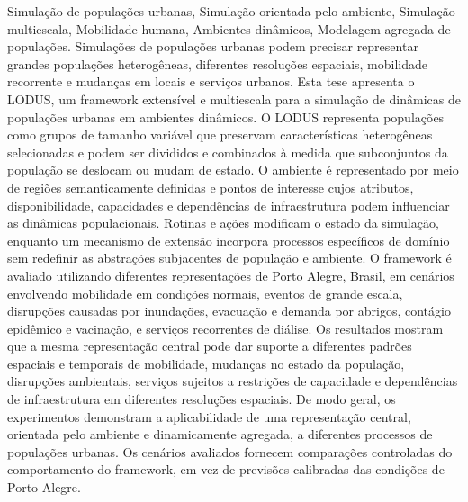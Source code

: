 \documentclass[english,twoside]{pucrs-ppgcc}
\begin{document}
\begin{resumo}{Simulação de populações urbanas, Simulação orientada pelo ambiente, Simulação multiescala, Mobilidade humana, Ambientes dinâmicos, Modelagem agregada de populações.}
Simulações de populações urbanas podem precisar representar grandes populações heterogêneas, diferentes resoluções espaciais, mobilidade recorrente e mudanças em locais e serviços urbanos.
Esta tese apresenta o LODUS, um framework extensível e multiescala para a simulação de dinâmicas de populações urbanas em ambientes dinâmicos. O LODUS representa populações como grupos de tamanho variável que preservam características heterogêneas selecionadas e podem ser divididos e combinados à medida que subconjuntos da população se deslocam ou mudam de estado.
O ambiente é representado por meio de regiões semanticamente definidas e pontos de interesse cujos atributos, disponibilidade, capacidades e dependências de infraestrutura podem influenciar as dinâmicas populacionais.
Rotinas e ações modificam o estado da simulação, enquanto um mecanismo de extensão incorpora processos específicos de domínio sem redefinir as abstrações subjacentes de população e ambiente.
O framework é avaliado utilizando diferentes representações de Porto Alegre, Brasil, em cenários envolvendo mobilidade em condições normais, eventos de grande escala, disrupções causadas por inundações, evacuação e demanda por abrigos, contágio epidêmico e vacinação, e serviços recorrentes de diálise.
Os resultados mostram que a mesma representação central pode dar suporte a diferentes padrões espaciais e temporais de mobilidade, mudanças no estado da população, disrupções ambientais, serviços sujeitos a restrições de capacidade e dependências de infraestrutura em diferentes resoluções espaciais.
De modo geral, os experimentos demonstram a aplicabilidade de uma representação central, orientada pelo ambiente e dinamicamente agregada, a diferentes processos de populações urbanas. Os cenários avaliados fornecem comparações controladas do comportamento do framework, em vez de previsões calibradas das condições de Porto Alegre.
\end{resumo}
\end{document}
